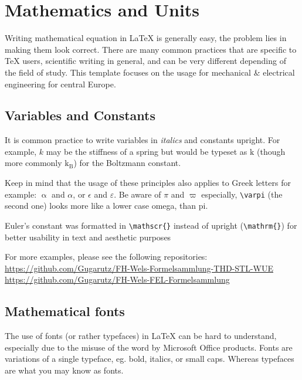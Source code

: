 \section{Mathematics and Units}
\begingroup \small

Writing mathematical equation in \LaTeX{} is generally easy, the problem lies in making them look correct. There are many common practices that are specific to \TeX{} users, scientific writing in general, and can be very different depending of the field of study. This template focuses on the usage for mechanical \& electrical engineering for central Europe.

\subsection{Variables and Constants}
    \label{sec:variables-const}

    It is common practice to write variables in \textit{italics} and constants upright.
    For example, $k$ may be the stiffness of a spring but would be typeset as $\mathrm{k}$ (though more commonly $\mathrm{k_B}$) for the Boltzmann constant.

    Keep in mind that the usage of these principles also applies to Greek letters for example: $\upalpha$ and $\alpha$, or $\epsilon$ and $\varepsilon$. Be aware of $\pi$ and $\varpi$ especially, \verb|\varpi| (the second one) looks more like a lower case omega, than pi.

    \begin{notebox}
        Euler's constant \e was formatted in \verb|\mathscr{}| instead of upright (\verb|\mathrm{}|) for better usability in text and aesthetic purposes
    \end{notebox}

    \begin{tipbox}
        For more examples, please see the following repositories:\\
        \url{https://github.com/Gugarutz/FH-Wels-Formelsammlung-THD-STL-WUE}\\
        \url{https://github.com/Gugarutz/FH-Wels-FEL-Formelsammlung}
    \end{tipbox}

\subsection{Mathematical fonts}
    The use of fonts (or rather typefaces) in \LaTeX{} can be hard to understand, especially due to the misuse of the word by Microsoft Office products. Fonts are variations of a single typeface, eg. bold, italics, or small caps. Whereas typefaces are what you may know as fonts.


